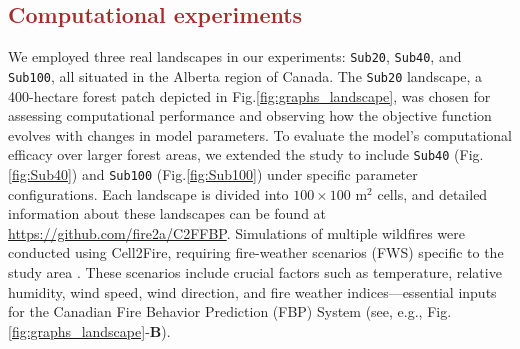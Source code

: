 \documentclass[a4paper,fleqn]{cas-sc}
\begin{document}
\subsection{\textcolor{brown}{Computational experiments}}

We employed three real landscapes in our experiments: \texttt{Sub20}, \texttt{Sub40}, and \texttt{Sub100}, all situated in the Alberta region of Canada. The \texttt{Sub20} landscape, a 400-hectare forest patch depicted in Fig.\:\ref{fig:graphs_landscape}, was chosen for assessing computational performance and observing how the objective function evolves with changes in model parameters. To evaluate the model's computational efficacy over larger forest areas, we extended the study to include \texttt{Sub40} (Fig.\:\ref{fig:Sub40}) and \texttt{Sub100} (Fig.\:\ref{fig:Sub100}) under specific parameter configurations. Each landscape is divided into $100 \times 100$ m$^2$ cells, and detailed information about these landscapes can be found at \url{https://github.com/fire2a/C2FFBP}. Simulations of multiple wildfires were conducted using Cell2Fire, requiring fire-weather scenarios (FWS) specific to the study area \citep{parisien2005mapping, pais2021cell2fire}. These scenarios include crucial factors such as temperature, relative humidity, wind speed, wind direction, and fire weather indices—essential inputs for the Canadian Fire Behavior Prediction (FBP) System \citep{hirsch1996canadian} (see, e.g., Fig.\:\ref{fig:graphs_landscape}-\textbf{B}).
\end{document}
